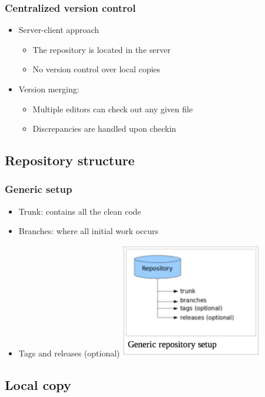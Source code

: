 \documentclass{beamer}
\begin{document}
\frame
{
  \frametitle{Centralized version control}
  
  \begin{itemize}
  \item<1-> Server-client approach
  	\begin{itemize}
	\item<1-> The repository is located in the server
	\item<2-> No version control over local copies
	\end{itemize}
  \item<3-> Version merging:
  	\begin{itemize}
  	\item<3-> Multiple editors can check out any given file
	\item<3-> Discrepancies are handled upon checkin
	\end{itemize}
  \end{itemize}
  
}

\subsection{Repository structure}

\frame
{
  \frametitle{Generic setup}
  
  \begin{itemize}
  \item<1-> Trunk: contains all the clean code
  \item<1-> Branches: where all initial work occurs
  \item<1-> Tags and releases (optional)
  \includegraphics[height=5cm]{repo_structure.png}
  \end{itemize}

}

\subsection{Local copy}
\end{document}
